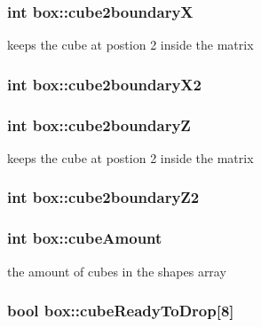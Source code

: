 \hypertarget{classbox_a6e87c5e202ad004d15e7f2d89700b89f}{
\subsubsection[{cube2boundary\-X}]{\setlength{\rightskip}{0pt plus 5cm}int box\-::cube2boundary\-X}}\label{classbox_a6e87c5e202ad004d15e7f2d89700b89f}
keeps the cube at postion 2 inside the matrix \hypertarget{classbox_af34d8a2cf54602fb899ba5a93ef77a2f}{
\subsubsection[{cube2boundary\-X2}]{\setlength{\rightskip}{0pt plus 5cm}int box\-::cube2boundary\-X2}}\label{classbox_af34d8a2cf54602fb899ba5a93ef77a2f}
\hypertarget{classbox_a64c685cd4b334e1d72b7f14c8a55f970}{
\subsubsection[{cube2boundary\-Z}]{\setlength{\rightskip}{0pt plus 5cm}int box\-::cube2boundary\-Z}}\label{classbox_a64c685cd4b334e1d72b7f14c8a55f970}
keeps the cube at postion 2 inside the matrix \hypertarget{classbox_a16fb873fcc45bf9e0e3aec4f94bed5a1}{
\subsubsection[{cube2boundary\-Z2}]{\setlength{\rightskip}{0pt plus 5cm}int box\-::cube2boundary\-Z2}}\label{classbox_a16fb873fcc45bf9e0e3aec4f94bed5a1}
\hypertarget{classbox_a1b4e32a86f15ec53e16cdf1b963b5c34}{
\subsubsection[{cube\-Amount}]{\setlength{\rightskip}{0pt plus 5cm}int box\-::cube\-Amount}}\label{classbox_a1b4e32a86f15ec53e16cdf1b963b5c34}
the amount of cubes in the shapes array \hypertarget{classbox_abe346da44b7ef7b328b4a796b120d1e7}{
\subsubsection[{cube\-Ready\-To\-Drop}]{\setlength{\rightskip}{0pt plus 5cm}bool box\-::cube\-Ready\-To\-Drop\mbox{[}8\mbox{]}}}\label{classbox_abe346da44b7ef7b328b4a796b120d1e7}
